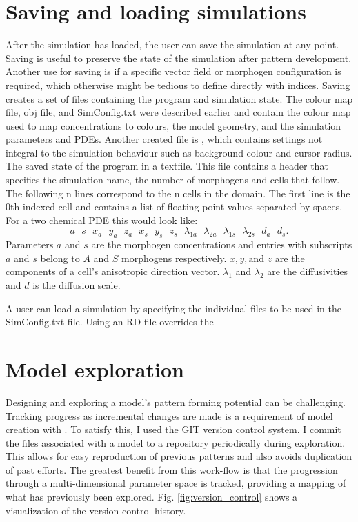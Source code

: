 \section{Saving and loading simulations}
After the simulation has loaded, the user can save the simulation at any point. Saving is useful to preserve the state of the simulation after pattern development. Another use for saving is if a specific vector field or morphogen configuration is required, which otherwise might be tedious to define directly with indices. Saving creates a set of files containing the program and simulation state. The colour map file, obj file, and SimConfig.txt were described earlier and contain the colour map used to map concentrations to colours, the model geometry, and the simulation parameters and PDEs. Another created file is , which contains settings not integral to the simulation behaviour such as background colour and cursor radius. The saved state of the program in a  textfile. This file contains a header that specifies the simulation name, the number of morphogens and cells that follow. The following n lines correspond to the n cells in the domain. The first line is the 0th indexed cell and contains a list of floating-point values separated by spaces. For a two chemical PDE this would look like:
\[a\text{ }s\text{ }x_a\text{ }y_a\text{ }z_a\text{ }x_s\text{ }y_s\text{ }z_s\text{ }\lambda_{1a}\text{ }\lambda_{2a}\text{ }\lambda_{1s}\text{ }\lambda_{2s}\text{ }d_a\text{ }d_s.\]
Parameters $a$ and $s$ are the morphogen concentrations and entries with subscripts $a$ and $s$ belong to $A$ and $S$ morphogens respectively. $x, y, \text{and } z$ are the components of a cell's anisotropic direction vector. $\lambda_1$ and $\lambda_2$ are the diffusivities and $d$ is the diffusion scale.

A user can load a simulation by specifying the individual files to be used in the SimConfig.txt file. Using an RD file overrides the 

\section{Model exploration}
Designing and exploring a model's pattern forming potential can be challenging. Tracking progress as incremental changes are made is a requirement of model creation with \ProgramName{}. To satisfy this, I used the GIT version control system. I commit the files associated with a model to a repository periodically during exploration. This allows for easy reproduction of previous patterns and also avoids duplication of past efforts. The greatest benefit from this work-flow is that the progression through a multi-dimensional parameter space is tracked, providing a mapping of what has previously been explored. Fig. \ref{fig:version_control} shows a visualization of the version control history.

